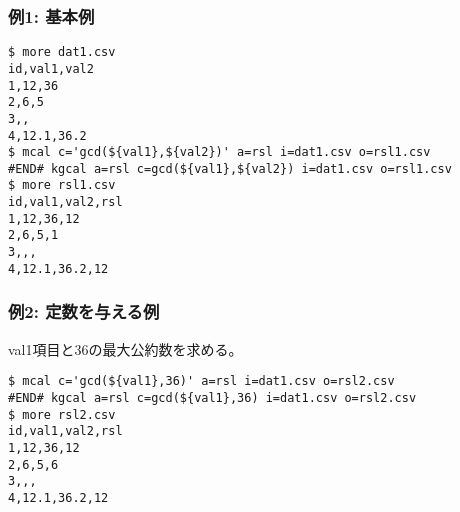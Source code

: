 \subsubsection*{例1: 基本例}



\begin{Verbatim}[baselinestretch=0.7,frame=single]
$ more dat1.csv
id,val1,val2
1,12,36
2,6,5
3,,
4,12.1,36.2
$ mcal c='gcd(${val1},${val2})' a=rsl i=dat1.csv o=rsl1.csv
#END# kgcal a=rsl c=gcd(${val1},${val2}) i=dat1.csv o=rsl1.csv
$ more rsl1.csv
id,val1,val2,rsl
1,12,36,12
2,6,5,1
3,,,
4,12.1,36.2,12
\end{Verbatim}
\subsubsection*{例2: 定数を与える例}

val1項目と36の最大公約数を求める。


\begin{Verbatim}[baselinestretch=0.7,frame=single]
$ mcal c='gcd(${val1},36)' a=rsl i=dat1.csv o=rsl2.csv
#END# kgcal a=rsl c=gcd(${val1},36) i=dat1.csv o=rsl2.csv
$ more rsl2.csv
id,val1,val2,rsl
1,12,36,12
2,6,5,6
3,,,
4,12.1,36.2,12
\end{Verbatim}
